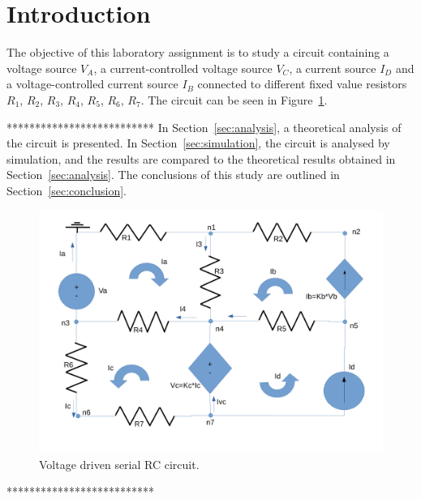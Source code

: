 \section{Introduction}
\label{sec:introduction}

The objective of this laboratory assignment is to study a circuit containing a voltage source $V_A$, a current-controlled voltage source $V_C$, a current source $I_D$ and a voltage-controlled current source $I_B$ connected to different fixed value resistors $R_1$, $R_2$, $R_3$, $R_4$, $R_5$, $R_6$, $R_7$. The circuit can be seen in Figure~\ref{fig:rc}.

**************************
In Section~\ref{sec:analysis}, a theoretical analysis of the circuit is
presented. In Section~\ref{sec:simulation}, the circuit is analysed by
simulation, and the results are compared to the theoretical results obtained in
Section~\ref{sec:analysis}. The conclusions of this study are outlined in
Section~\ref{sec:conclusion}.

\begin{figure}[h] \centering
\includegraphics[width=0.4\linewidth]{circuit.pdf}
\caption{Voltage driven serial RC circuit.}
\label{fig:rc}
\end{figure}
**************************
